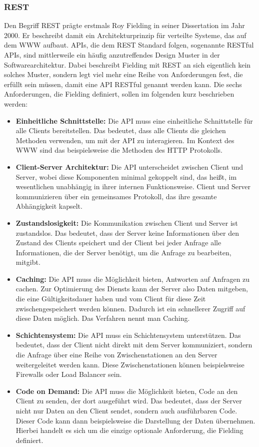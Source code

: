 \subsubsection*{REST}
Den Begriff \ac{REST} prägte erstmals Roy Fielding in seiner Dissertation im Jahr 2000. Er beschreibt damit ein Architekturprinzip für verteilte Systeme, das auf dem \ac{WWW} aufbaut. \cite[Vgl. ][S. 76]{REST2000} \ac{API}s, die dem REST Standard folgen, sogenannte \ac{REST}ful \ac{API}s, sind mittlerweile ein häufig anzutreffendes Design Muster in der Softwarearchitektur. Dabei beschreibt Fielding mit \ac{REST} an sich eigentlich kein solches Muster, sondern legt viel mehr eine Reihe von Anforderungen fest, die erfüllt sein müssen, damit eine \ac{API} \ac{REST}ful genannt werden kann. \cite[Vgl. ][S. XV]{richardson2007web} Die sechs Anforderungen, die Fielding definiert, sollen im folgenden kurz beschrieben werden:
\begin{itemize}
  \item 
  \textbf{Einheitliche Schnittstelle:} Die \ac{API} muss eine einheitliche Schnittstelle für alle Clients bereitstellen. Das bedeutet, dass alle Clients die gleichen Methoden verwenden, um mit der \ac{API} zu interagieren. Im Kontext des \ac{WWW} sind das beispielsweise die Methoden des \ac{HTTP} Protokolls.
  \item \textbf{Client-Server Architektur:} Die \ac{API} unterscheidet zwischen Client und Server, wobei diese Komponenten minimal gekoppelt sind, das heißt, im wesentlichen unabhängig in ihrer internen Funktionsweise. Client und Server kommunizieren über ein gemeinsames Protokoll, das ihre gesamte Abhängigkeit kapselt.
  \item \textbf{Zustandslosigkeit:} Die Kommunikation zwischen Client und Server ist zustandslos. Das bedeutet, dass der Server keine Informationen über den Zustand des Clients speichert und der Client bei jeder Anfrage alle Informationen, die der Server benötigt, um die Anfrage zu bearbeiten, mitgibt. 
  \item \textbf{Caching:} Die \ac{API} muss die Möglichkeit bieten, Antworten auf Anfragen zu cachen. Zur Optimierung des Diensts kann der Server also Daten mitgeben, die eine Gültigkeitsdauer haben und vom Client für diese Zeit zwischengespeichert werden können. Dadurch ist ein schnellerer Zugriff auf diese Daten möglich. Das Verfahren nennt man Caching.
  \item \textbf{Schichtensystem:} Die \ac{API} muss ein Schichtensystem unterstützen. Das bedeutet, dass der Client nicht direkt mit dem Server kommuniziert, sondern die Anfrage über eine Reihe von Zwischenstationen an den Server weitergeleitet werden kann. Diese Zwischenstationen können beispielsweise Firewalls oder Load Balancer sein.
  \item \textbf{Code on Demand:} Die \ac{API} muss die Möglichkeit bieten, Code an den Client zu senden, der dort ausgeführt wird. Das bedeutet, dass der Server nicht nur Daten an den Client sendet, sondern auch ausführbaren Code. Dieser Code kann dann beispielsweise die Darstellung der Daten übernehmen. Hierbei handelt es sich um die einzige optionale Anforderung, die Fielding definiert. \cite[Vgl. ][]{redhat_2020_was}
\end{itemize}


